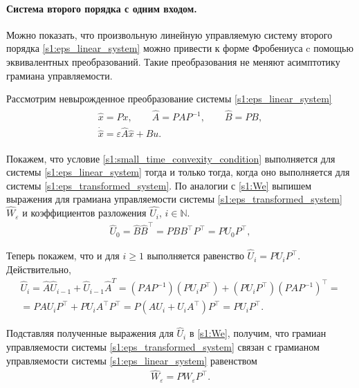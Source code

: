 \documentclass[../main.tex]{subfiles}
\begin{document}
\paragraph{Система второго порядка с одним входом.}
Можно показать, что произвольную линейную управляемую систему второго порядка \eqref{s1:eps_linear_system} можно привести к форме Фробениуса c помощью эквивалентных преобразований.
Такие преобразования не меняют асимптотику грамиана управляемости.

Рассмотрим невырожденное преобразование системы \eqref{s1:eps_linear_system}
\begin{gather}\label{s1:eps_transformed_system}
\begin{gathered}
	\hat{x} = P x, \qquad \hat{A} = P A P^{-1}, \qquad \hat{B} = P B, \\
	\dot{\hat{x}} = \varepsilon \hat{A} \hat{x} + \hat{B} u. 
\end{gathered}
\end{gather}

Покажем, что условие \eqref{s1:small_time_convexity_condition} выполняется для системы \eqref{s1:eps_linear_system} тогда и только тогда, когда оно выполняется для системы \eqref{s1:eps_transformed_system}.
 По аналогии с \eqref{s1:We} выпишем выражения для грамиана управляемости системы \eqref{s1:eps_transformed_system} $\hat{W}_{\varepsilon}$ и коэффициентов разложения $\hat{U_i}$, $i \in \mathbb{N}$.
\begin{gather*}
	\hat{U}_0 = \hat{B} \hat{B}^{\top} = P B B^{\top} P^{\top} = P U_0 P^{\top}, 
\end{gather*}

Теперь покажем, что и для $i \geqslant 1$ выполняется равенство $\hat{U}_i = P U_i P^{\top}$.
Действительно,
\begin{gather*}
	\hat{U}_i = \hat{A} \hat{U}_{i-1} + \hat{U}_{i-1} \hat{A}^T = \left(P A P^{-1} \right) \left( P U_i P^{\top} \right) + \left( P U_i P^{\top}\right) \left(P A P^{-1} \right)^{\top} = \\ 
	= P A U_i P^{\top} + P U_i A^{\top} P^{\top} = P \left( A U_i + U_i A^{\top} \right) P^{\top} = P U_i P^{\top}.
\end{gather*}

Подставляя полученные выражения для $\hat{U}_i$ в \eqref{s1:We}, получим, что грамиан управляемости системы \eqref{s1:eps_transformed_system} связан с грамианом управляемости системы \eqref{s1:eps_linear_system} равенством
\begin{gather*}
	\hat{W}_{\varepsilon} = P W_{\varepsilon} P^{\top}.
\end{gather*}
\end{document}
